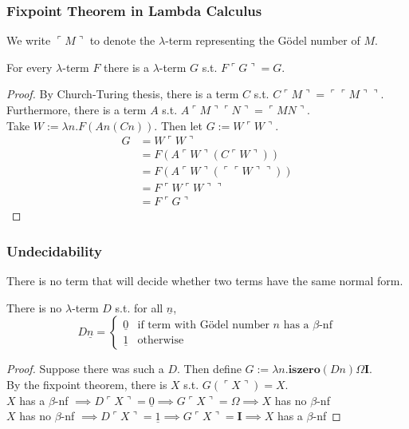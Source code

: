 \documentclass[UTF8,aspectratio=43,11pt,colorlinks,compress,openany]{beamer}%
\begin{document}
\begin{frame}\frametitle{Fixpoint Theorem in Lambda Calculus}
	We write $\ulcorner M\urcorner$ to denote the $\lambda$-term representing the G\"odel number of $M$.
	\begin{theorem}
		For every $\lambda$-term $F$ there is a $\lambda$-term $G$ s.t. $F\ulcorner G\urcorner=G$.
	\end{theorem}
	\begin{proof}
		By Church-Turing thesis, there is a term $C$ s.t. $C\ulcorner M\urcorner=\ulcorner\ulcorner M\urcorner\urcorner$.\\
		Furthermore, there is a term $A$ s.t. $A\ulcorner M\urcorner\ulcorner N\urcorner=\ulcorner MN\urcorner$.\\
		Take $W:=\lambda n.F(An(Cn))$. Then let $G:=W\ulcorner W\urcorner$.
	\setlength\belowdisplayskip{0pt}
		\begin{align*}
		G&=W\ulcorner W\urcorner\\
		&=F(A\ulcorner W\urcorner(C\ulcorner W\urcorner))\\
		&=F(A\ulcorner W\urcorner(\ulcorner\ulcorner W\urcorner\urcorner))\\
		&=F\ulcorner W\ulcorner W\urcorner\urcorner\\
		&=F\ulcorner G\urcorner
		\end{align*}
	\end{proof}
\end{frame}

\begin{frame}\frametitle{Undecidability}
	\begin{theorem}[Church1936]
		There is no term that will decide whether two terms have the same normal form.
	\end{theorem}
	\begin{theorem}[Church1936]
		There is no $\lambda$-term $D$ s.t. for all $\underline{n}$,
		\[D\underline{n}=
		\begin{cases}
		\underline{0}&\text{if term with G\"odel number $n$ has a $\beta$-nf}\\
		\underline{1}&\text{otherwise}
		\end{cases}\]
	\end{theorem}
	\begin{proof}
		Suppose there was such a $D$. Then define $G:=\lambda n.\mathbf{iszero}(Dn)\Omega\mathbf{I}$.\\
		By the fixpoint theorem, there is $X$ s.t. $G(\ulcorner X\urcorner)=X$.\\
		$X$ has a $\beta$-nf $\implies D\ulcorner X\urcorner=\underline{0}\implies G\ulcorner X\urcorner=\Omega\implies X$ has no $\beta$-nf\\
		$X$ has no $\beta$-nf $\implies D\ulcorner X\urcorner=\underline{1}\implies G\ulcorner X\urcorner=\mathbf{I}\implies X$ has a $\beta$-nf
	\end{proof}
\end{frame}
\end{document}
